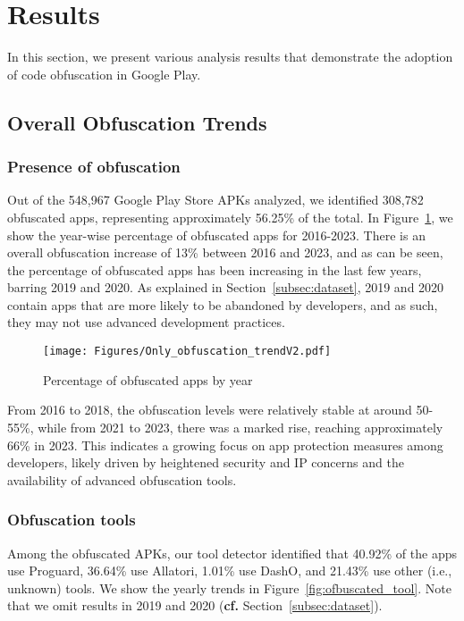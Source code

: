 \section{Results}
\label{sec:Results}

In this section, we present various analysis results that demonstrate the adoption of code obfuscation in Google Play.

\subsection{Overall Obfuscation Trends} 
\label{sec:obstrend}

\subsubsection{Presence of obfuscation} Out of the 548,967 Google Play Store APKs analyzed, we identified 308,782 obfuscated apps, representing approximately 56.25\% of the total. In Figure~\ref{fig:obfuscated_percentage}, we show the year-wise percentage of obfuscated apps for 2016-2023. There is an overall obfuscation increase of 13\% between 2016 and 2023, and as can be seen, the percentage of obfuscated apps has been increasing in the last few years, barring 2019 and 2020. As explained in Section~\ref{subsec:dataset}, 2019 and 2020 contain apps that are more likely to be abandoned by developers, and as such, they may not use advanced development practices.

\begin{figure}[h!]
\centering
    \texttt{[image: Figures/Only\_obfuscation\_trendV2.pdf]}
    \caption{Percentage of obfuscated apps by year} \vspace{-4mm}
    \label{fig:obfuscated_percentage}
\end{figure}


From 2016 to 2018, the obfuscation levels were relatively stable at around 50-55\%, while from 2021 to 2023, there was a marked rise, reaching approximately 66\% in 2023. This indicates a growing focus on app protection measures among developers, likely driven by heightened security and IP concerns and the availability of advanced obfuscation tools.


\subsubsection{Obfuscation tools} Among the obfuscated APKs, our tool detector identified that 40.92\% of the apps use Proguard, 36.64\% use Allatori, 1.01\% use DashO, and 21.43\% use other (i.e., unknown) tools. We show the yearly trends in Figure~\ref{fig:ofbuscated_tool}. Note that we omit results in 2019 and 2020 ({\bf cf.} Section~\ref{subsec:dataset}).


